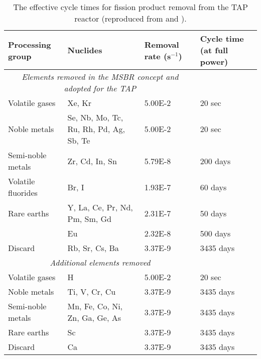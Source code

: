 \begin{table}[htp!]
	\centering
	\caption{The effective cycle times for fission product removal  from the 
		\gls{TAP} reactor (reproduced from \cite{betzler_implementation_2017} 
		and 
		\cite{transatomic_power_corporation_neutronics_2016}).}
	\begin{tabular}{p{} p{} p{} 
			p{}}
		\hline 
		\textbf{Processing group} & \qquad\qquad\qquad \textbf{Nuclides} & 
		\textbf{Removal rate (s$^{-1}$)} & \textbf{Cycle time (at full power)} 
		\\ [5pt] \hline 
		\multicolumn{3}{c}{\textit{Elements removed in the \gls{MSBR} concept 
		and adopted for the \gls{TAP}} \cite{robertson_conceptual_1971}} \\
		Volatile gases & Xe, Kr								  & 5.00E-2 & 20 
		sec \\ [5pt]
		Noble metals & Se, Nb, Mo, Tc, Ru, Rh, Pd, Ag, Sb, Te & 5.00E-2 & 20 
		sec \\ [5pt]
		Semi-noble metals & Zr, Cd, In, Sn	  				  & 5.79E-8 & 200 
		days \\ [5pt]
		Volatile fluorides & Br, I 							  & 1.93E-7 & 60 
		days \\ [5pt]
		Rare earths & Y, La, Ce, Pr, Nd, Pm, Sm, Gd           & 2.31E-7 & 50 
		days \\ [5pt]
		\qquad & Eu & 2.32E-8 & 500 days \\ [5pt]
		Discard & Rb, Sr, Cs, Ba & 3.37E-9 & 3435 days \\ [5pt] 
		\hline
		
		\multicolumn{3}{c}{\textit{Additional elements removed} 
			\cite{transatomic_power_corporation_neutronics_2016, 
				betzler_implementation_2017}  } \\
		Volatile gases & H								  	& 5.00E-2 & 20 
		sec    \\ [5pt]
		Noble metals & Ti, V, Cr, Cu						& 3.37E-9 & 3435 
		days \\ [5pt]
		Semi-noble metals & Mn, Fe, Co, Ni, Zn, Ga, Ge, As   & 3.37E-9 & 3435 
		days \\ [5pt]
		Rare earths & Sc									& 3.37E-9 & 3435 
		days \\ [5pt]
		Discard & Ca										& 3.37E-9 & 3435 
		days \\ [5pt] 
		\hline
	\end{tabular}
	\label{tab:reprocessing_list}
	\vspace{-0.9em}
\end{table}



